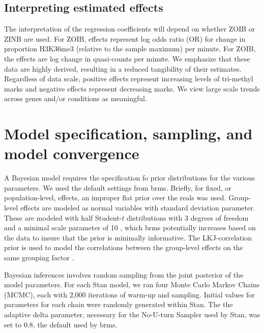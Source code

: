 \documentclass[12pt]{extarticle}
\begin{document}
\subsection*{Interpreting estimated effects}

The interpretation of the regression coefficients will depend on whether ZOIB or ZINB are used. For ZOIB, effects represent log odds ratio (OR) for change in proportion H3K36me3 (relative to the sample maximum) per minute. For ZOIB, the effects are log change in quasi-counts per minute. We emphasize that these data are highly derived, resulting in a reduced tangibility of their estimates. Regardless of data scale, positive effects represent increasing levels of tri-methyl marks and negative effects represent decreasing marks. We view large scale trends across genes and/or conditions as meaningful.

\section*{Model specification, sampling, and model convergence}

A Bayesian model requires the specification fo prior distributions for the various parameters. We used the default settings from brms. Briefly, for fixed, or population-level, effects, an improper flat prior over the reals was used. Group-level effects are modeled as normal variables with standard deviation parameter. These are modeled with half Student-$t$ distributions with 3 degrees of freedom and a minimal scale parameter of 10 \cite{Gelman2006}, which brms potentially increases based on the data to insure that the prior is minimally informative. The LKJ-correlation prior is used to model the correlations between the group-level effects on the same grouping factor \cite{Lewandowski2009}.

Bayesian inferences involves random sampling from the joint posterior of the model parameters. For each Stan model, we ran four Monte Carlo Markov Chains (MCMC), each with 2,000 iterations of warm-up and sampling. Initial values for parameters for each chain were randomly generated within Stan. The the adaptive delta parameter, necessary for the No-U-turn Sampler \cite{Hoffman2014} used by Stan, was set to 0.8, the default used by brms.
\end{document}
